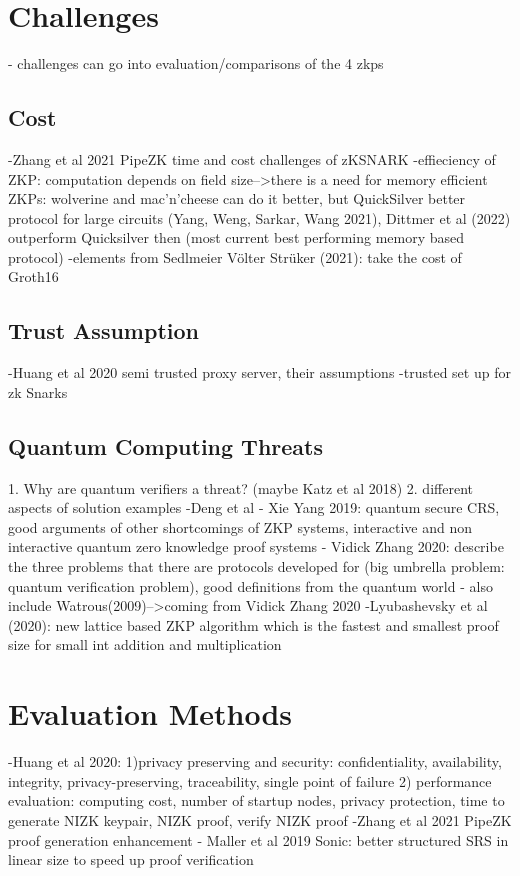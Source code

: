 \section{Challenges}
- challenges can go into evaluation/comparisons of the 4 zkps
\subsection{Cost}
-Zhang et al 2021 PipeZK time and cost challenges of zKSNARK
-effieciency of ZKP: computation depends on field size-->there is a need for memory efficient ZKPs: wolverine and mac'n'cheese can do it better, but QuickSilver better protocol for large circuits (Yang, Weng, Sarkar, Wang 2021), Dittmer et al (2022) outperform Quicksilver then (most current best performing memory based protocol)
-elements from Sedlmeier Völter Strüker (2021): take the cost of Groth16

\subsection{Trust Assumption}
-Huang et al 2020 semi trusted proxy server, their assumptions
-trusted set up for zk Snarks

\subsection{Quantum Computing Threats}
1. Why are quantum verifiers a threat? (maybe Katz et al 2018)
2. different aspects of solution examples
-Deng et al 
- Xie Yang 2019: quantum secure CRS, good arguments of other shortcomings of ZKP systems, interactive and non interactive quantum zero knowledge proof systems
- Vidick Zhang 2020: describe the three problems that there are protocols developed for (big umbrella problem: quantum verification problem), good definitions from the quantum world
- also include Watrous(2009)-->coming from Vidick Zhang 2020
-Lyubashevsky et al (2020): new lattice based ZKP algorithm which is the fastest and smallest proof size for small int addition and multiplication 

\section{Evaluation Methods}
-Huang et al 2020: 1)privacy preserving and security: confidentiality, availability, integrity, privacy-preserving, traceability, single point of failure 2) performance evaluation: computing cost, number of startup nodes, privacy protection, time to generate NIZK keypair, NIZK proof, verify NIZK proof
-Zhang et al 2021 PipeZK proof generation enhancement
- Maller et al 2019 Sonic: better structured SRS in linear size to speed up proof verification

